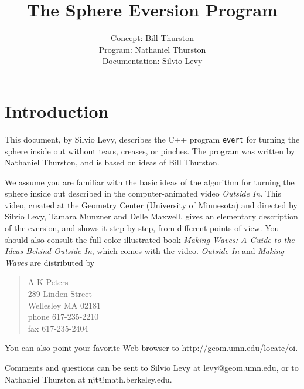 
\addtolength{\textheight}{1in}
\addtolength{\topmargin}{-.5in}
\addtolength{\textwidth}{1in}
\addtolength{\oddsidemargin}{-.5in}
\addtolength{\evensidemargin}{-.5in}

\def\OI/{{\it Outside In}}
\def\MW/{{\it Making Waves}}
\def\Ev/{{\tt Evert}}
\def\ev/{{\tt evert}}

\title{The Sphere Eversion Program}
\author{Concept: Bill Thurston\\
Program: Nathaniel Thurston\\
Documentation: Silvio Levy}



\maketitle

\section*{Introduction}

This document, by Silvio Levy, describes the C++ program \ev/ for turning the sphere inside out without tears, creases, or pinches. The
program was written by Nathaniel Thurston, and is based on ideas of Bill Thurston.

We assume you are familiar with the basic ideas of the algorithm for turning the sphere inside out described in the computer-animated video
\OI/. This video, created at the Geometry Center (University of Minnesota) and directed by Silvio Levy, Tamara Munzner and Delle
Maxwell, gives an elementary description of the eversion, and shows it step by step, from different points of view. You should also consult
the full-color illustrated book {\it Making Waves: A Guide to the Ideas Behind \OI/}, which comes with the video. \OI/ and \MW/ are distributed by
%
\begin{verse}
A K Peters\\
289 Linden Street\\
Wellesley MA 02181\\
phone 617-235-2210\\
fax 617-235-2404\par
\end{verse}
%
You can also point your favorite Web browser to
http:/$\!$/geom.umn.edu/locate/oi.

Comments and questions can be sent to Silvio Levy at levy@geom.umn.edu, or to Nathaniel Thurston at njt@math.berkeley.edu.

